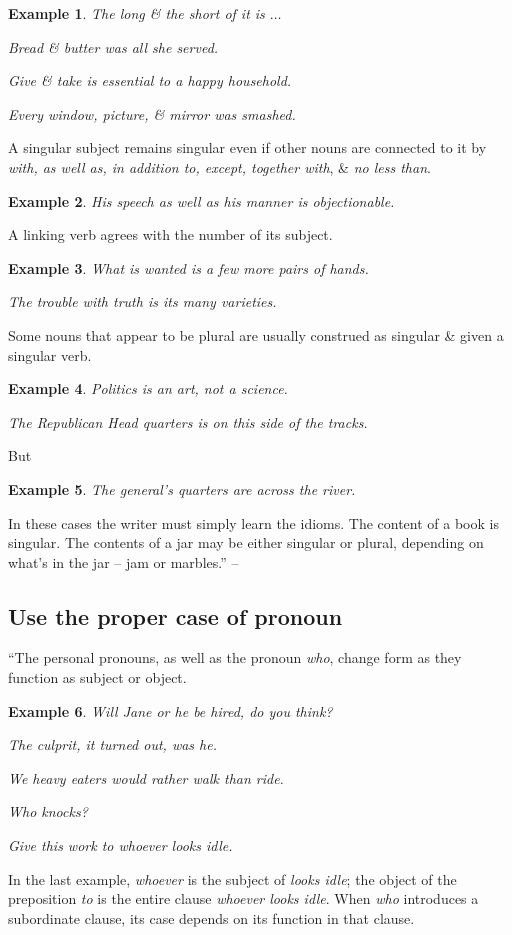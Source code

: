 \documentclass[oneside]{book}
\numberwithin{equation}{section}
\newtheorem{example}{Example}[chapter]
\begin{document}
\begin{example}
	The long \& the short of it is $\ldots$
	
	Bread \& butter was all she served.
	
	Give \& take is essential to a happy household.
	
	Every window, picture, \& mirror was smashed.
\end{example}
A singular subject remains singular even if other nouns are connected to it by \textit{with, as well as, in addition to, except, together with}, \& \textit{no less than}.

\begin{example}
	His speech as well as his manner is objectionable.
\end{example}
A linking verb agrees with the number of its subject.

\begin{example}
	What is wanted is a few more pairs of hands.
	
	The trouble with truth is its many varieties.
\end{example}
Some nouns that appear to be plural are usually construed as singular \& given a singular verb.

\begin{example}
	Politics is an art, not a science.
	
	The Republican Head quarters is on this side of the tracks.
\end{example}
But
\begin{example}
	The general's quarters are across the river.
\end{example}
In these cases the writer must simply learn the idioms. The content of a book is singular. The contents of a jar may be either singular or plural, depending on what's in the jar -- jam or marbles.'' -- \cite[Chap. 1, Sect. 9, pp. 23--24]{Strunk_White2019}

\subsection{Use the proper case of pronoun}
``The personal pronouns, as well as the pronoun \textit{who}, change form as they function as subject or object.

\begin{example}
	Will Jane or he be hired, do you think?
	
	The culprit, it turned out, was he.
	
	We heavy eaters would rather walk than ride.
	
	Who knocks?
	
	Give this work to whoever looks idle.
\end{example}
In the last example, \textit{whoever} is the subject of \textit{looks idle}; the object of the preposition \textit{to} is the entire clause \textit{whoever looks idle}. When \textit{who} introduces a subordinate clause, its case depends on its function in that clause.
\end{document}
